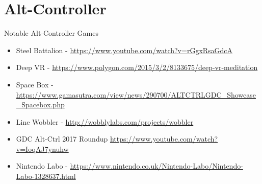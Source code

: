 \part{Alt-Controller}
\frame{\partpage}

\begin{frame}{Notable Alt-Controller Games}
\begin{itemize}
	\item Steel Battalion - \url{https://www.youtube.com/watch?v=rGgxRsaGdcA}
	\item Deep VR - \url{https://www.polygon.com/2015/3/2/8133675/deep-vr-meditation}
	\item Space Box - \url{https://www.gamasutra.com/view/news/290700/ALTCTRLGDC_Showcase_Spacebox.php}
	\item Line Wobbler - \url{http://wobblylabs.com/projects/wobbler}
	\item GDC Alt-Ctrl 2017 Roundup \url{https://www.youtube.com/watch?v=IoqAJ7ynuhw}
	\item Nintendo Labo - \url{https://www.nintendo.co.uk/Nintendo-Labo/Nintendo-Labo-1328637.html}
\end{itemize}
\end{frame}